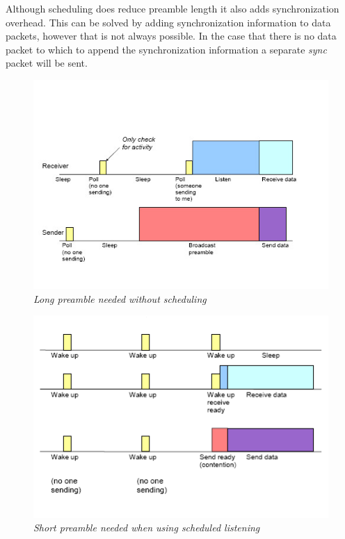 Although scheduling does reduce preamble length it also adds synchronization
overhead. This can be solved by adding synchronization information to data
packets, however that is not always possible. In the case that there is no data
packet to which to append the synchronization information a separate
\emph{sync} packet will be sent.

\clearpage

\begin{figure}[ht]
	\begin{center}
		\includegraphics[scale=0.9]{img/scp_long_preambles.jpg}
	\end{center}
	\caption{\small \itshape{Long preamble needed without
	scheduling\protect\footnotemark}}
	\label{fig:scp_long_preambles}
\end{figure}

\begin{figure}[ht]
	\begin{center}
		\includegraphics[scale=0.9]{img/scp_short_preambles.jpg}
	\end{center}
	\caption{\small \itshape{Short preamble needed when using scheduled 
	listening\protect\footnotemark}}
	\label{fig:scp_short_preambles}
\end{figure}

